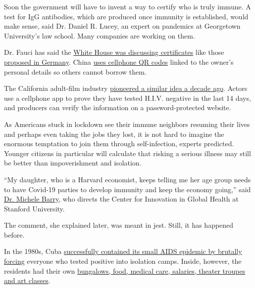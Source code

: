 Soon the government will have to invent a way to certify who is truly
immune. A test for IgG antibodies, which are produced once immunity is
established, would make sense, said Dr. Daniel R. Lucey, an expert on
pandemics at Georgetown University's law school. Many companies are
working on them.

Dr. Fauci has said the
\href{https://www.politico.com/news/2020/04/10/fauci-coronavirus-immunity-cards-for-americans-are-being-discussed-178784}{White
House was discussing certificates} like those
\href{https://www.newsweek.com/germany-antibodies-tests-general-public-immunity-certificates-1494934}{proposed
in Germany}. China
\href{https://www.nytimes.com/2020/03/01/business/china-coronavirus-surveillance.html}{uses
cellphone QR codes} linked to the owner's personal details so others
cannot borrow them.

The California adult-film industry
\href{https://www.nytimes.com/2012/11/06/health/unlikely-model-for-hiv-prevention-porn-industry.html}{pioneered
a similar idea a decade ago}. Actors use a cellphone app to prove they
have tested H.I.V. negative in the last 14 days, and producers can
verify the information on a password-protected website.

As Americans stuck in lockdown see their immune neighbors resuming their
lives and perhaps even taking the jobs they lost, it is not hard to
imagine the enormous temptation to join them through self-infection,
experts predicted. Younger citizens in particular will calculate that
risking a serious illness may still be better than impoverishment and
isolation.

``My daughter, who is a Harvard economist, keeps telling me her age
group needs to have Covid-19 parties to develop immunity and keep the
economy going,'' said
\href{https://kingcenter.stanford.edu/people/michele-barry}{Dr. Michele
Barry}, who directs the Center for Innovation in Global Health at
Stanford University.

The comment, she explained later, was meant in jest. Still, it has
happened before.

In the 1980s, Cuba
\href{https://www.nytimes.com/2012/05/08/health/a-regimes-tight-grip-lessons-from-cuba-in-aids-control.html}{successfully
contained its small AIDS epidemic by brutally forcing} everyone who
tested positive into isolation camps. Inside, however, the residents had
their own
\href{https://www.nytimes.com/2012/05/08/health/cubas-aids-sanitariums-fortresses-against-a-viral-foe.html}{bungalows,
food, medical care, salaries, theater troupes and art classes}.

